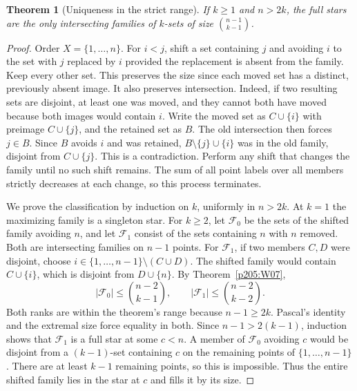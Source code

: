 \documentclass[11pt,oneside,openany]{book}
\theoremstyle{plain}
\newtheorem{theorem}{Theorem}[chapter]
\theoremstyle{definition}
\theoremstyle{remark}
\begin{document}
\begin{theorem}[Uniqueness in the strict range]\label{p205:W08}
If \(k\ge1\) and \(n>2k\), the full stars are the only intersecting
families of \(k\)-sets of size \(\binom{n-1}{k-1}\).
\end{theorem}
\begin{proof}
Order \(X=\{1,\ldots,n\}\). For \(i<j\), shift a set containing
\(j\) and avoiding \(i\) to the set with \(j\) replaced by \(i\)
provided the replacement is absent from the family. Keep every
other set. This preserves the size since each moved set has a
distinct, previously absent image. It also preserves intersection.
Indeed, if two resulting sets are disjoint, at least one was
moved, and they cannot both have moved because both images
would contain \(i\). Write the moved set as \(C\cup\{i\}\) with
preimage \(C\cup\{j\}\), and the retained set as \(B\). The old
intersection then forces \(j\in B\). Since \(B\) avoids \(i\) and
was retained, \(B\setminus\{j\}\cup\{i\}\) was in the old family,
disjoint from \(C\cup\{j\}\). This is a contradiction.
Perform any shift that changes the family until no such shift remains.
The sum of all point labels over all members strictly decreases at
each change, so this process terminates.

We prove the classification by induction on \(k\), uniformly in
\(n>2k\). At \(k=1\) the maximizing family is a singleton star.
For \(k\ge2\), let \(\mathcal F_0\) be the sets of the shifted
family avoiding \(n\), and let \(\mathcal F_1\) consist of the
sets containing \(n\) with \(n\) removed. Both are intersecting
families on \(n-1\) points. For \(\mathcal F_1\), if two members
\(C,D\) were disjoint, choose \(i\in\{1,\dots,n-1\}\setminus(C\cup D)\).
The shifted family would contain \(C\cup\{i\}\), which is disjoint
from \(D\cup\{n\}\). By Theorem~\ref{p205:W07},
\[
 |\mathcal F_0|\le\binom{n-2}{k-1},
 \qquad |\mathcal F_1|\le\binom{n-2}{k-2}.
\]
Both ranks are within the theorem's range because \(n-1\ge2k\).
Pascal's identity and the extremal size force equality in both.
Since \(n-1>2(k-1)\), induction shows that \(\mathcal F_1\) is a
full star at some \(c<n\). A member of \(\mathcal F_0\) avoiding
\(c\) would be disjoint from a \((k-1)\)-set containing \(c\)
on the remaining points of \(\{1,\ldots,n-1\}\). There are at
least \(k-1\) remaining points, so this is impossible.
Thus the entire shifted family lies in the star at \(c\)
and fills it by its size.


\end{proof}
\end{document}
